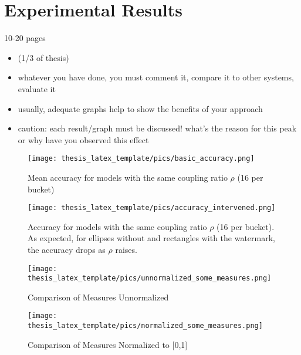 \chapter{Experimental Results}\label{chapter:results}

{ \color{red}
10-20 pages 

    \begin{itemize}
        \item (1/3 of thesis)
        \item whatever you have done, you must comment it, compare it to other systems, evaluate it
        \item usually, adequate graphs help to show the benefits of your approach
        \item caution: each result/graph must be discussed! what's the reason for this peak or why have you observed this effect
    \end{itemize}
}

\begin{figure}
    \centering
    \texttt{[image: thesis\_latex\_template/pics/basic\_accuracy.png]}
    \caption[Accuracy]{Mean accuracy for models with the same coupling ratio $\rho$ (16 per bucket)}
    \label{fig:basic_accuracy}
\end{figure}


\begin{figure}
    \centering
    \texttt{[image: thesis\_latex\_template/pics/accuracy\_intervened.png]}
    \caption[Accuracy for intervened Subsets]{Accuracy for models with the same coupling ratio $\rho$ (16 per bucket). As expected, for ellipses without and rectangles with the watermark, the accuracy drops as $\rho$ raises.}
    \label{fig:basic_accuracy}
\end{figure}

\begin{figure}
    \centering
    \texttt{[image: thesis\_latex\_template/pics/unnormalized\_some\_measures.png]}
    \caption{Comparison of Measures Unnormalized}
    \label{fig:unnormalized}
\end{figure}


\begin{figure}
    \centering
    \texttt{[image: thesis\_latex\_template/pics/normalized\_some\_measures.png]}
    \caption{Comparison of Measures Normalized to [0,1]}
    \label{fig:normalized}
\end{figure}


